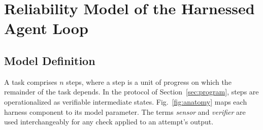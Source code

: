 \documentclass[journal]{IEEEtran}
\begin{document}
\section{Reliability Model of the Harnessed Agent Loop}\label{sec:model}

\subsection{Model Definition}\label{sec:setup}
A task comprises $n$ steps, where a step is a unit of progress on which the remainder of the task depends. In the protocol of Section~\ref{sec:program}, steps are operationalized as verifiable intermediate states. Fig.~\ref{fig:anatomy} maps each harness component to its model parameter. The terms \emph{sensor} and \emph{verifier} are used interchangeably for any check applied to an attempt's output.
\end{document}
